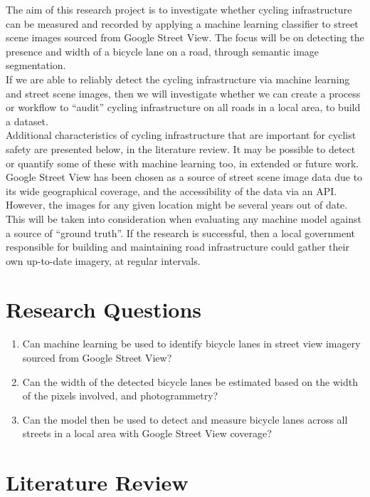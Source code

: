 \documentclass{article}
\begin{document}
The aim of this research project is to investigate whether cycling infrastructure can be measured and recorded by applying a machine learning classifier to street scene images sourced from Google Street View.  The focus will be on detecting the presence and width of a bicycle lane on a road, through semantic image segmentation.
\\

If we are able to reliably detect the cycling infrastructure via machine learning and street scene images, then we will investigate whether we can create a process or workflow to ``audit'' cycling infrastructure on all roads in a local area, to build a dataset. \\

Additional characteristics of cycling infrastructure that are important for cyclist safety are presented below, in the literature review.  It may be possible to detect or quantify some of these with machine learning too, in extended or future work. \\

Google Street View has been chosen as a source of street scene image data due to its wide geographical coverage, and the accessibility of the data via an API.  However, the images for any given location might be several years out of date.  This will be taken into consideration when evaluating any machine model against a source of ``ground truth''.  If the research is successful, then a local government responsible for building and maintaining road infrastructure could gather their own up-to-date imagery, at regular intervals.

\section{Research Questions}
\begin{enumerate}
\item{Can machine learning be used to identify bicycle lanes in street view imagery sourced from Google Street View?}
\item{Can the width of the detected bicycle lanes be estimated based on the width of the pixels involved, and photogrammetry?}
\item{Can the model then be used to detect and measure bicycle lanes across all streets in a local area with Google Street View coverage?}	
\end{enumerate}

\cleardoublepage

\section{Literature Review}
\end{document}
